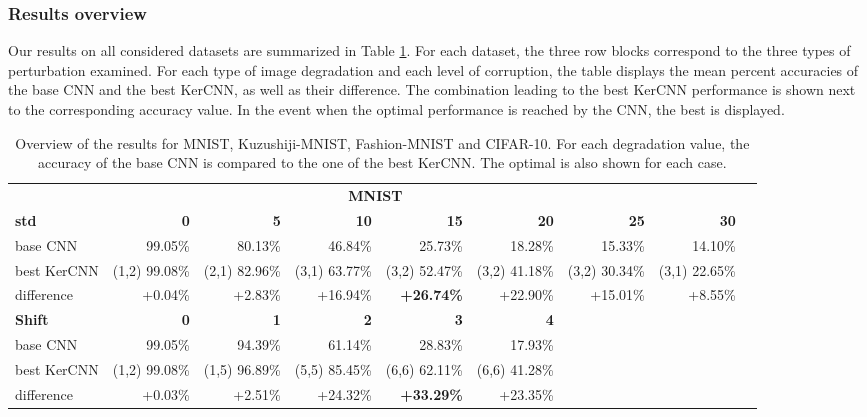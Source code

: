 \documentclass[11pt,oneside,reqno]{amsart}
\begin{document}
 
 
 \subsubsection{Results overview}\label{resoverview}
 
 Our results on all considered datasets are summarized in Table \ref{tab:overview}. For each dataset, the three row blocks correspond to the three types of perturbation examined. For each type of image degradation and each level of corruption, the table displays the mean percent accuracies of the base CNN and the best KerCNN, as well as their difference. The combination  leading to the best KerCNN performance is shown next to the corresponding accuracy value. In the event when the optimal performance is reached by the CNN, the best  is displayed.
 {\renewcommand{\arraystretch}{.7} \begin{table}[htbp!]
 \centering
 \tiny
  \caption{Overview of the results for MNIST, Kuzushiji-MNIST, Fashion-MNIST and CIFAR-10. For each degradation value, the accuracy of the base CNN is compared to the one of the best KerCNN. The optimal  is also shown for each case.}
 \label{tab:overview}
 \begin{tabular}{@{}lrrrrrrrr@{}}
 \toprule
      \multicolumn{8}{c}{\textbf{MNIST}}\vspace{5pt}\\
      \textbf{std } & \textbf{0} & \textbf{5} & \textbf{10} & \textbf{15} & \textbf{20} & \textbf{25} & \textbf{30} \\ 
      base CNN & 99.05\% & 80.13\% & 46.84\% & 25.73\% & 18.28\% & 15.33\% & 14.10\% \\ 
      best KerCNN & (1,2) 99.08\% & (2,1) 82.96\% & (3,1) 63.77\% & (3,2) 52.47\% & (3,2) 41.18\% & (3,2) 30.34\% & (3,1) 22.65\% \\
      difference & +0.04\% & +2.83\% & +16.94\% & \textbf{+26.74\%} & +22.90\% & +15.01\% & +8.55\% \vspace{5pt}\\  
      \textbf{Shift } & \textbf{0} & \textbf{1} & \textbf{2} & \textbf{3} & \textbf{4} & & \\
    base CNN & 99.05\% & 94.39\% & 61.14\% & 28.83\% & 17.93\% & & \\ 
      best KerCNN & (1,2) 99.08\% & (1,5) 96.89\% & (5,5) 85.45\% & (6,6) 62.11\% & (6,6) 41.28\% & &  \\
    difference & +0.03\% & +2.51\% & +24.32\% & \textbf{+33.29\%} & +23.35\% & & \vspace{5pt}\\

\end{tabular}
\end{table}}
\end{document}
